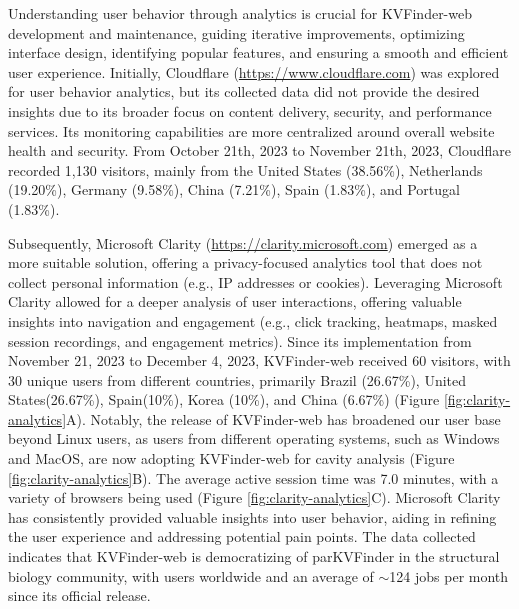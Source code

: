 \documentclass[Ingles]{phdthesis}
\def\eg{e.g.\onedot}
\begin{document}
Understanding user behavior through analytics is crucial for KVFinder-web development and maintenance, guiding iterative improvements, optimizing interface design, identifying popular features, and ensuring a smooth and efficient user experience. Initially, Cloudflare (\url{https://www.cloudflare.com}) was explored for user behavior analytics, but its collected data did not provide the desired insights due to its broader focus on content delivery, security, and performance services. Its monitoring capabilities are more centralized around overall website health and security. From October 21th, 2023 to November 21th, 2023, Cloudflare recorded 1,130 visitors, mainly from the United States (38.56\%), Netherlands (19.20\%), Germany (9.58\%), China (7.21\%), Spain (1.83\%), and Portugal (1.83\%). 

Subsequently, Microsoft Clarity (\url{https://clarity.microsoft.com}) emerged as a more suitable solution, offering a privacy-focused analytics tool that does not collect personal information (\eg, IP addresses or cookies). Leveraging Microsoft Clarity allowed for a deeper analysis of user interactions, offering valuable insights into navigation and engagement (\eg, click tracking, heatmaps, masked session recordings, and engagement metrics). Since its implementation from November 21, 2023 to December 4, 2023, KVFinder-web received 60 visitors, with 30 unique users from different countries, primarily Brazil (26.67\%), United States(26.67\%), Spain(10\%), Korea (10\%), and China (6.67\%) (Figure \ref{fig:clarity-analytics}A). Notably, the release of KVFinder-web has broadened our user base beyond Linux users, as users from different operating systems, such as Windows and MacOS, are now adopting KVFinder-web for cavity analysis (Figure \ref{fig:clarity-analytics}B). The average active session time was 7.0 minutes, with a variety of browsers being used (Figure \ref{fig:clarity-analytics}C). Microsoft Clarity has consistently provided valuable insights into user behavior, aiding in refining the user experience and addressing potential pain points. The data collected indicates that KVFinder-web is democratizing of parKVFinder in the structural biology community, with users worldwide and an average of $\sim$124 jobs per month since its official release.
\end{document}
